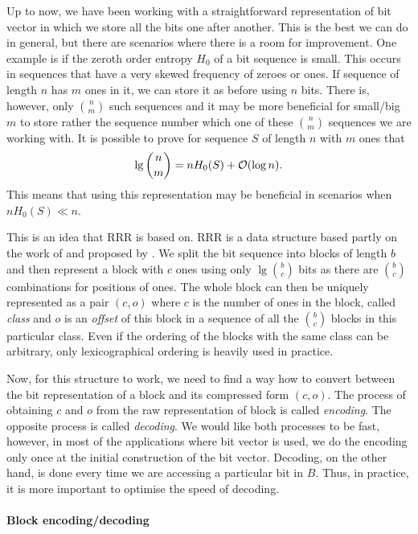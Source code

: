 Up to now, we have been working with a straightforward representation of bit vector in which we store
all the bits one after another. This is the best we can do in general, but there are scenarios
where there is a room for improvement. One example is if the zeroth order entropy $H_0$ of a bit sequence
is small. This occurs in sequences that have a very skewed frequency of zeroes or ones. If sequence of
length $n$ has $m$ ones in it, we can store it as before using $n$ bits. There is, however, only ${n \choose m}$
such sequences and it may be more beneficial for small/big $m$ to store rather the sequence number which
one of these ${n \choose m}$ sequences we are working with. It is possible to prove for sequence $S$ of
length $n$ with $m$ ones that $$\mathop{\mathrm{lg}} {n \choose m} = nH_0(S)+\mathcal{O}(\log n).$$ This means that using this
representation may be beneficial in scenarios when $nH_0(S)\ll n$.

This is an idea that RRR is based on. RRR is a data structure based partly on the work of \cite{pagh2001low}
and proposed by \cite{raman2007succinct}. We split the bit sequence into blocks of length $b$ and then
represent a block with $c$ ones using only $\lg {b \choose c}$ bits as there are ${b \choose c}$ combinations
for positions of ones. The whole block can then be uniquely represented as a pair $(c, o)$ where $c$ is the
number of ones in the block, called \emph{class} and $o$ is an \emph{offset} of this block in a sequence of
all the ${b \choose c}$ blocks in this particular class. Even if the ordering of the blocks with the same class
can be arbitrary, only lexicographical ordering is heavily used in practice.

Now, for this structure to work, we need to find a way how to convert between the bit representation of
a block and its compressed form $(c, o)$. The process of obtaining $c$ and $o$ from the raw representation
of block is called \textit{encoding}. The opposite process is called \textit{decoding}. We would like both
processes to be fast, however, in most of the applications where bit vector is used, we do the encoding only
once at the initial construction of the bit vector. Decoding, on the other hand, is done every time we are
accessing a particular bit in $B$. Thus, in practice, it is more important to optimise the speed of decoding.

\paragraph{Block encoding/decoding}

